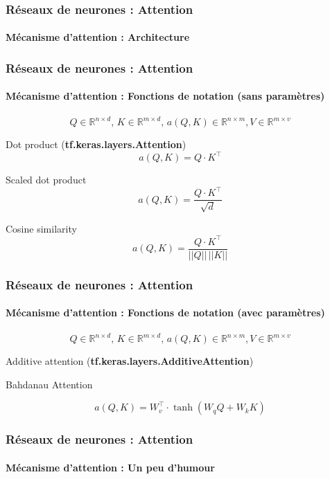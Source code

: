 \documentclass[xcolor=table]{beamer}
\begin{document}
\begin{frame}
	\frametitle{Réseaux de neurones : Attention}
	\framesubtitle{Mécanisme d'attention : Architecture}
	
	\begin{center}
	\end{center}
	
\end{frame}


\begin{frame}
	\frametitle{Réseaux de neurones : Attention}
	\framesubtitle{Mécanisme d'attention : Fonctions de notation (sans paramètres)}
	
	\[Q \in \mathbb{R}^{n \times d}, \, K \in \mathbb{R}^{m \times d}, \, a(Q, K) \in \mathbb{R}^{n \times m}, V \in \mathbb{R}^{m \times v} \]
	
	\vspace{12pt}
	
	Dot product (\textbf{tf.keras.layers.Attention})
	\[a(Q, K) = Q \cdot K^\top\]
	
	Scaled dot product 
	\[a(Q, K) = \frac{Q \cdot K^\top}{\sqrt{d}}\]
	
	Cosine similarity
	\[a(Q, K) = \frac{Q \cdot K^\top}{||Q|| \, ||K||}\]
	
\end{frame}

\begin{frame}
	\frametitle{Réseaux de neurones : Attention}
	\framesubtitle{Mécanisme d'attention : Fonctions de notation (avec paramètres)}
	
	\[Q \in \mathbb{R}^{n \times d}, \, K \in \mathbb{R}^{m \times d}, \, a(Q, K) \in \mathbb{R}^{n \times m}, V \in \mathbb{R}^{m \times v} \]
	
	\vspace{12pt}
	
	Additive attention (\textbf{tf.keras.layers.AdditiveAttention})
	
	Bahdanau Attention
	
	\[a(Q, K) = W_v^\top \cdot \tanh(W_q Q + W_k K)\]
	
\end{frame}


\begin{frame}
	\frametitle{Réseaux de neurones : Attention}
	\framesubtitle{Mécanisme d'attention : Un peu d'humour}
	
	\begin{center}
	\end{center}
	
\end{frame}
\end{document}

